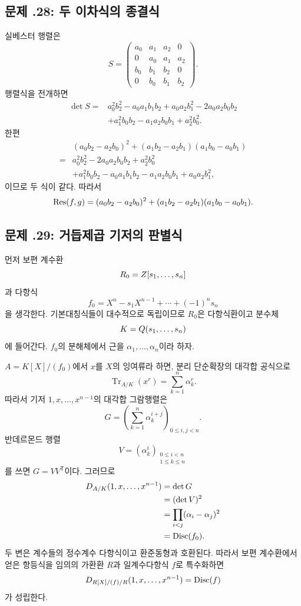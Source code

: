 \subsection*{문제 \thechapter.28: 두 이차식의 종결식}

\begin{solution}
실베스터 행렬은
\[
  S=
  \begin{pmatrix}
  a_0&a_1&a_2&0\\
  0&a_0&a_1&a_2\\
  b_0&b_1&b_2&0\\
  0&b_0&b_1&b_2
  \end{pmatrix}.
\]
행렬식을 전개하면
\[
\begin{aligned}
  \det S={}&a_0^2b_2^2-a_0a_1b_1b_2
  +a_0a_2b_1^2-2a_0a_2b_0b_2\\
  &+a_1^2b_0b_2-a_1a_2b_0b_1+a_2^2b_0^2.
\end{aligned}
\]
한편
\[
\begin{aligned}
 &(a_0b_2-a_2b_0)^2
 +(a_1b_2-a_2b_1)(a_1b_0-a_0b_1)\\
 ={}&a_0^2b_2^2-2a_0a_2b_0b_2+a_2^2b_0^2\\
 &+a_1^2b_0b_2-a_0a_1b_1b_2
 -a_1a_2b_0b_1+a_0a_2b_1^2,
\end{aligned}
\]
이므로 두 식이 같다. 따라서
\[
  \operatorname{Res}(f,g)
  =(a_0b_2-a_2b_0)^2
  +(a_1b_2-a_2b_1)(a_1b_0-a_0b_1).
\]
\end{solution}

\subsection*{문제 \thechapter.29: 거듭제곱 기저의 판별식}

\begin{solution}
먼저 보편 계수환
\[
  R_0=Z[s_1,\dots,s_n]
\]
과 다항식
\[
  f_0=X^n-s_1X^{n-1}+\cdots+(-1)^ns_n
\]
을 생각한다. 기본대칭식들이 대수적으로 독립이므로 $R_0$은 다항식환이고 분수체
\[
  K=Q(s_1,\dots,s_n)
\]
에 들어간다. $f_0$의 분해체에서 근을 $\alpha_1,\dots,\alpha_n$이라 하자.

$A=K[X]/(f_0)$에서 $x$를 $X$의 잉여류라 하면, 분리 단순확장의 대각합 공식으로
\[
  \operatorname{Tr}_{A/K}(x^r)
  =\sum_{k=1}^n\alpha_k^r.
\]
따라서 기저 $1,x,\dots,x^{n-1}$의 대각합 그람행렬은
\[
  G=\left(
  \sum_{k=1}^n\alpha_k^{i+j}
  \right)_{0\le i,j<n}.
\]
반데르몬드 행렬
\[
  V=(\alpha_k^i)_{
  \substack{0\le i<n\\1\le k\le n}}
\]
를 쓰면 $G=VV^{\mathsf T}$이다. 그러므로
\[
\begin{aligned}
  D_{A/K}(1,x,\dots,x^{n-1})
  &=\det G\\
  &=(\det V)^2\\
  &=\prod_{i<j}(\alpha_i-\alpha_j)^2\\
  &=\operatorname{Disc}(f_0).
\end{aligned}
\]
두 변은 계수들의 정수계수 다항식이고 환준동형과 호환된다. 따라서 보편 계수환에서 얻은 항등식을 임의의 가환환 $R$과 일계수다항식 $f$로 특수화하면
\[
  D_{R[X]/(f)/R}(1,x,\dots,x^{n-1})=\operatorname{Disc}(f)
\]
가 성립한다.
\end{solution}
